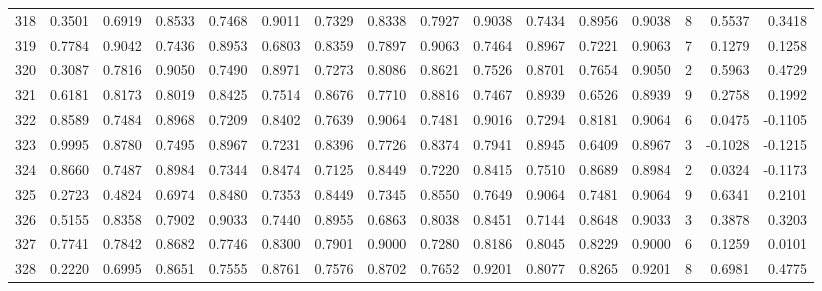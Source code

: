 \begin{tabular}{lrrrrrrrrrrrrrrr}
318 &      0.3501 &  0.6919 &  0.8533 &  0.7468 &  0.9011 &  0.7329 &  0.8338 &  0.7927 &  0.9038 &  0.7434 &   0.8956 &     0.9038 &      8 &                    0.5537 &                     0.3418 \\
319 &      0.7784 &  0.9042 &  0.7436 &  0.8953 &  0.6803 &  0.8359 &  0.7897 &  0.9063 &  0.7464 &  0.8967 &   0.7221 &     0.9063 &      7 &                    0.1279 &                     0.1258 \\
320 &      0.3087 &  0.7816 &  0.9050 &  0.7490 &  0.8971 &  0.7273 &  0.8086 &  0.8621 &  0.7526 &  0.8701 &   0.7654 &     0.9050 &      2 &                    0.5963 &                     0.4729 \\
321 &      0.6181 &  0.8173 &  0.8019 &  0.8425 &  0.7514 &  0.8676 &  0.7710 &  0.8816 &  0.7467 &  0.8939 &   0.6526 &     0.8939 &      9 &                    0.2758 &                     0.1992 \\
322 &      0.8589 &  0.7484 &  0.8968 &  0.7209 &  0.8402 &  0.7639 &  0.9064 &  0.7481 &  0.9016 &  0.7294 &   0.8181 &     0.9064 &      6 &                    0.0475 &                    -0.1105 \\
323 &      0.9995 &  0.8780 &  0.7495 &  0.8967 &  0.7231 &  0.8396 &  0.7726 &  0.8374 &  0.7941 &  0.8945 &   0.6409 &     0.8967 &      3 &                   -0.1028 &                    -0.1215 \\
324 &      0.8660 &  0.7487 &  0.8984 &  0.7344 &  0.8474 &  0.7125 &  0.8449 &  0.7220 &  0.8415 &  0.7510 &   0.8689 &     0.8984 &      2 &                    0.0324 &                    -0.1173 \\
325 &      0.2723 &  0.4824 &  0.6974 &  0.8480 &  0.7353 &  0.8449 &  0.7345 &  0.8550 &  0.7649 &  0.9064 &   0.7481 &     0.9064 &      9 &                    0.6341 &                     0.2101 \\
326 &      0.5155 &  0.8358 &  0.7902 &  0.9033 &  0.7440 &  0.8955 &  0.6863 &  0.8038 &  0.8451 &  0.7144 &   0.8648 &     0.9033 &      3 &                    0.3878 &                     0.3203 \\
327 &      0.7741 &  0.7842 &  0.8682 &  0.7746 &  0.8300 &  0.7901 &  0.9000 &  0.7280 &  0.8186 &  0.8045 &   0.8229 &     0.9000 &      6 &                    0.1259 &                     0.0101 \\
328 &      0.2220 &  0.6995 &  0.8651 &  0.7555 &  0.8761 &  0.7576 &  0.8702 &  0.7652 &  0.9201 &  0.8077 &   0.8265 &     0.9201 &      8 &                    0.6981 &                     0.4775 \\

\end{tabular}

